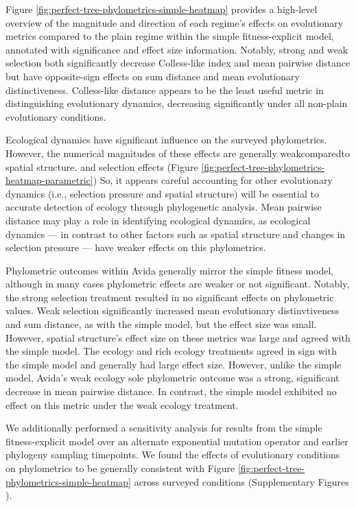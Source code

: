 Figure \ref{fig:perfect-tree-phylometrics-simple-heatmap} provides a high-level overview of the magnitude and direction of each regime's effects on evolutionary metrics compared to the plain regime within the simple fitness-explicit model, annotated with significance and effect size information.
Notably, strong and weak selection both significantly decrease Colless-like index and mean pairwise distance but have opposite-sign effects on sum distance and mean evolutionary distinctiveness.
Colless-like distance appears to be the least useful metric in distinguishing evolutionary dynamics, decreasing significantly under all non-plain evolutionary conditions.

Ecological dynamics have significant influence on the surveyed phylometrics.
However, the numerical magnitudes of these effects are generally weakcomparedto spatial structure. and selection effects (Figure \ref{fig:perfect-tree-phylometrics-heatmap-parametric})
So, it appears careful accounting for other evolutionary dynamics (i.e., selection pressure and spatial structure) will be essential to accurate detection of ecology through phylogenetic analysis.
Mean pairwise distance may play a role in identifying ecological dynamics, as ecological dynamics --- in contrast to other factors such as spatial structure and changes in selection pressure --- have weaker effects on this phylometrics.

Phylometric outcomes within Avida generally mirror the simple fitness model, although in many cases phylometric effects are weaker or not significant.
Notably, the strong selection treatment resulted in no significant effects on phylometric values.
Weak selection significantly increased mean evolutionary distinvtiveness and sum distance, as with the simple model, but the effect size was small.
However, spatial structure's effect size on these metrics was large and agreed with the simple model.
The ecology and rich ecology treatments agreed in sign with the simple model and generally had large effect size.
However, unlike the simple model, Avida's weak ecology sole phylometric outcome was a strong, significant decrease in mean pairwise distance.
In contrast, the simple model exhibited no effect on this metric under the weak ecology treatment.

We additionally performed a sensitivity analysis for results from the simple fitness-explicit model over an alternate exponential mutation operator and earlier phylogeny sampling timepoints.
We found the effects of evolutionary conditions on phylometrics to be generally consistent with Figure \ref{fig:perfect-tree-phylometrics-simple-heatmap} across surveyed conditions (Supplementary Figures ).

